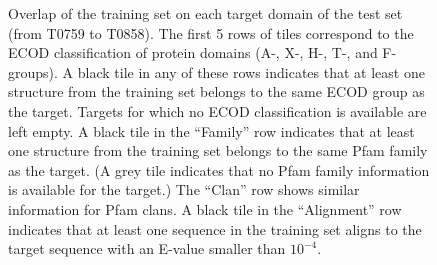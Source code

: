 \begin{figure}[H]
%
    \caption{Overlap of the training set on each target domain of the
    test set (from T0759 to T0858). The first 5 rows of tiles
    correspond to the ECOD classification of protein domains (A-, X-,
    H-, T-, and F-groups). A black tile in any of these rows indicates
    that at least one structure from the training set belongs to the
    same ECOD group as the target. Targets for which no ECOD
    classification is available are left empty.
    A black tile in the ``Family'' row indicates that at least one
    structure from the training set belongs to the same Pfam family as
    the target. (A grey tile indicates that no Pfam family information
    is available for the target.) The ``Clan'' row shows similar
    information for Pfam clans. A black tile in the ``Alignment'' row
    indicates that at least one sequence in the training set aligns to
    the target sequence with an E-value smaller than $10^{-4}$.}
%
    \label{Fig:summaryTable}
\end{figure}
